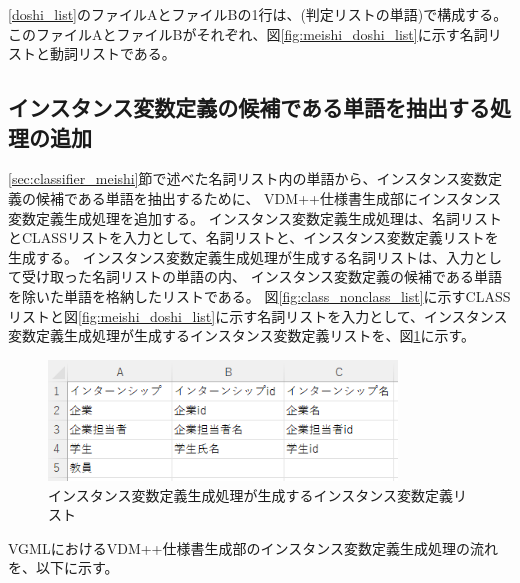 \ref{doshi_list}のファイルAとファイルBの1行は、(判定リストの単語)で構成する。
このファイルAとファイルBがそれぞれ、図\ref{fig:meishi_doshi_list}に示す名詞リストと動詞リストである。

\subsection{インスタンス変数定義の候補である単語を抽出する処理の追加}
\ref{sec:classifier_meishi}節で述べた名詞リスト内の単語から、インスタンス変数定義の候補である単語を抽出するために、
VDM++仕様書生成部にインスタンス変数定義生成処理を追加する。
インスタンス変数定義生成処理は、名詞リストとCLASSリストを入力として、名詞リストと、インスタンス変数定義リストを生成する。
インスタンス変数定義生成処理が生成する名詞リストは、入力として受け取った名詞リストの単語の内、
インスタンス変数定義の候補である単語を除いた単語を格納したリストである。
図\ref{fig:class_nonclass_list}に示すCLASSリストと図\ref{fig:meishi_doshi_list}に示す名詞リストを入力として、インスタンス変数定義生成処理が生成するインスタンス変数定義リストを、図\ref{fig:instance_list}に示す。

\begin{figure}[t]
    \begin{center}
        \includegraphics[width=350]{image/instance_list.png}
        \caption{インスタンス変数定義生成処理が生成するインスタンス変数定義リスト}
        \label{fig:instance_list}
    \end{center}
\end{figure}

VGMLにおけるVDM++仕様書生成部のインスタンス変数定義生成処理の流れを、以下に示す。

